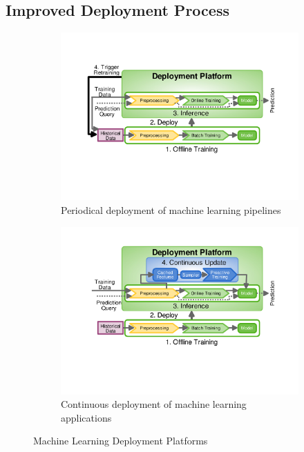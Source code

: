 \subsection{Improved Deployment Process}
\begin{figure}[t]
\begin{subfigure}{\columnwidth}
\centering
\includegraphics[width=\columnwidth]{../images/generic-motivational-example-v2.pdf}
\caption{Periodical deployment of machine learning pipelines}
\label{fig:motivational-example}
\end{subfigure}%
\begin{subfigure}{\columnwidth}
\centering
\includegraphics[width=\columnwidth]{../images/generic-improved-example-v2.pdf}
\caption{Continuous deployment of machine learning applications}
\label{fig:improved-example}
\end{subfigure}
\caption{Machine Learning Deployment Platforms}
\label{deployment-processes}
\end{figure}
